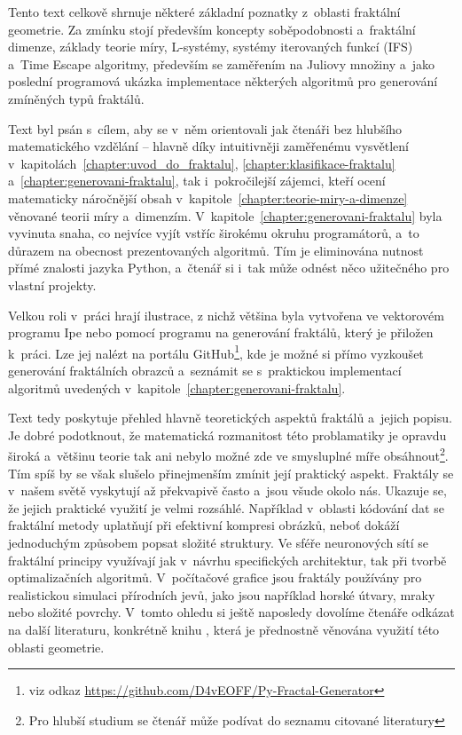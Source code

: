 
Tento text celkově shrnuje některé základní poznatky z~oblasti fraktální geometrie. Za zmínku stojí především koncepty soběpodobnosti a~fraktální dimenze, základy teorie míry, L-systémy, systémy iterovaných funkcí (IFS) a~Time Escape algoritmy, především se zaměřením na Juliovy množiny a~jako poslední programová ukázka implementace některých algoritmů pro generování zmíněných typů fraktálů.

Text byl psán s~cílem, aby se v~něm orientovali jak čtenáři bez hlubšího matematického vzdělání -- hlavně díky intuitivněji zaměřenému vysvětlení v~kapitolách~\ref{chapter:uvod_do_fraktalu}, \ref{chapter:klasifikace-fraktalu} a~\ref{chapter:generovani-fraktalu}, tak i~pokročilejší zájemci, kteří ocení matematicky náročnější obsah v~kapitole~\ref{chapter:teorie-miry-a-dimenze} věnované teorii míry a~dimenzím. V~kapitole~\ref{chapter:generovani-fraktalu} byla vyvinuta snaha, co nejvíce vyjít vstříc širokému okruhu programátorů, a~to důrazem na obecnost prezentovaných algoritmů. Tím je eliminována nutnost přímé znalosti jazyka Python, a~čtenář si i~tak může odnést něco užitečného pro vlastní projekty.

Velkou roli v~práci hrají ilustrace, z nichž většina byla vytvořena ve vektorovém programu Ipe nebo pomocí programu na generování fraktálů, který je přiložen k~práci. Lze jej nalézt na portálu GitHub\footnote{viz odkaz \url{https://github.com/D4vEOFF/Py-Fractal-Generator}}, kde je možné si přímo vyzkoušet generování fraktálních obrazců a~seznámit se s~praktickou implementací algoritmů uvedených v~kapitole~\ref{chapter:generovani-fraktalu}.

Text tedy poskytuje přehled hlavně teoretických aspektů fraktálů a~jejich popisu. Je dobré podotknout, že matematická rozmanitost této problamatiky je opravdu široká a~většinu teorie tak ani nebylo možné zde ve smysluplné míře obsáhnout\footnote{Pro hlubší studium se čtenář může podívat do seznamu citované literatury}. Tím spíš by se však slušelo přinejmenším zmínit její praktický aspekt. Fraktály se v~našem světě vyskytují až překvapivě často a~jsou všude okolo nás. Ukazuje se, že jejich praktické využití je velmi rozsáhlé. Například v~oblasti kódování dat se fraktální metody uplatňují při efektivní kompresi obrázků, neboť dokáží jednoduchým způsobem popsat složité struktury. Ve sféře neuronových sítí se fraktální principy využívají jak v~návrhu specifických architektur, tak při tvorbě optimalizačních algoritmů. V~počítačové grafice jsou fraktály používány pro realistickou simulaci přírodních jevů, jako jsou například horské útvary, mraky nebo složité povrchy. V~tomto ohledu si ještě naposledy dovolíme čtenáře odkázat na další literaturu, konkrétně knihu \cite{Zelinka2006}, která je přednostně věnována využití této oblasti geometrie.

